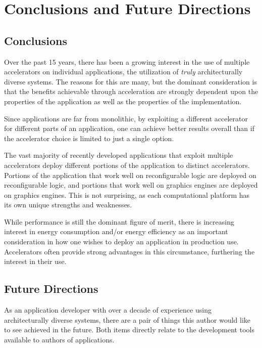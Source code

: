 \section{Conclusions and Future Directions}
\label{sec:conclude}

\subsection{Conclusions}

Over the past 15 years, there has been a growing interest in the use of
multiple accelerators on individual applications, the utilization of
\emph{truly} architecturally diverse systems.  The reasons for this
are many, but the dominant consideration is that the benefits achievable
through acceleration are strongly dependent upon the properties of the
application as well as the properties of the implementation.

Since applications are far from monolithic, by exploiting a different
accelerator for different parts of an application, one can achieve
better results overall than if the accelerator choice is limited to just
a single option.

The vast majority of recently developed applications that
exploit multiple accelerators deploy different portions of the application
to distinct accelerators.  Portions of the application that work well
on reconfigurable logic are deployed on reconfigurable logic, and portions
that work well on graphics engines are deployed on graphics engines.
This is not surprising, as each computational platform has its own
unique strengths and weaknesses.

While performance is still the dominant figure of merit, there is
increasing interest in energy consumption and/or energy efficiency as
an important consideration in how one wishes to deploy an application
in production use.  Accelerators often provide strong advantages 
in this circumstance, furthering the interest in their use.

\subsection{Future Directions}


As an application developer with over a decade of experience using
architecturally diverse systems, there are a pair of things this
author would like to see achieved in the future. Both items directly
relate to the development tools available to authors of applications.


